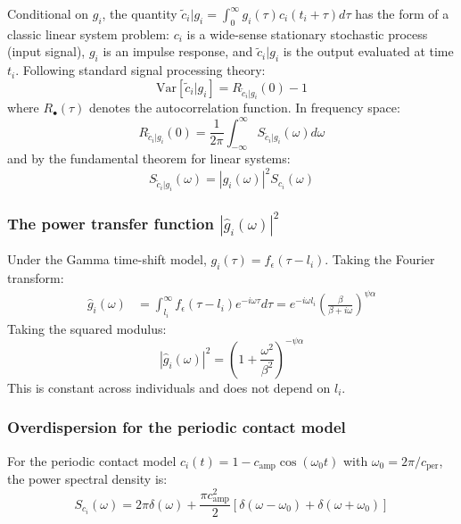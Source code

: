 \documentclass[10pt]{article}
\begin{document}
Conditional on $g_i$, the quantity $\tilde{c}_i | g_i = \int_0^\infty g_i(\tau) c_i(t_i+\tau) d\tau$ has the form of a classic linear system problem: $c_i$ is a wide-sense stationary stochastic process (input signal), $g_i$ is an impulse response, and $\tilde{c}_i | g_i$ is the output evaluated at time $t_i$. Following standard signal processing theory:
\begin{equation}
	\text{Var}[\tilde{c}_i | g_i] = R_{\tilde{c}_i | g_i}(0) - 1
\end{equation}
where $R_{\bullet}(\tau)$ denotes the autocorrelation function. In frequency space:
\begin{equation}
	R_{\tilde{c}_i | g_i}(0) = \frac{1}{2\pi} \int_{-\infty}^{\infty} S_{\tilde{c}_i | g_i}(\omega) d\omega
\end{equation}
and by the fundamental theorem for linear systems:
\begin{equation}
	S_{\tilde{c}_i | g_i}(\omega) = |\hat{g}_i(\omega)|^2 S_{c_i}(\omega)
\end{equation}

\subsubsection{The power transfer function $|\hat{g}_i(\omega)|^2$}

Under the Gamma time-shift model, $g_i(\tau) = f_\epsilon(\tau - l_i)$. Taking the Fourier transform:
\begin{align}
	\hat{g}_i(\omega) &= \int_{l_i}^{\infty} f_\epsilon(\tau - l_i) e^{-i \omega \tau}  d\tau = e^{-i \omega l_i} \left(  \frac{\beta}{\beta + i \omega}\right)^{\psi \alpha}
\end{align}
Taking the squared modulus:
\begin{equation}
	|\hat{g}_i(\omega)|^2 = \left(1 + \frac{\omega^2}{\beta^2}\right)^{-\psi \alpha}
\end{equation}
This is constant across individuals and does not depend on $l_i$.

\subsubsection{Overdispersion for the periodic contact model}

For the periodic contact model $c_i(t) = 1 - c_\text{amp} \cos(\omega_0 t)$ with $\omega_0 = 2\pi/c_\text{per}$, the power spectral density is:
\begin{equation}
	S_{c_i}(\omega) = 2 \pi \delta(\omega) + \frac{\pi c_\text{amp}^2}{2}[\delta(\omega - \omega_0) + \delta(\omega + \omega_0)]
\end{equation}
\end{document}
